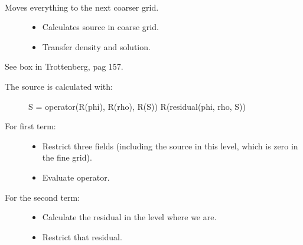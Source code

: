 \documentclass[letterpaper,10pt,english]{sphinxmanual}
\begin{document}
\begin{fulllineitems}
\label{\detokenize{sphinx-c-apidoc/output/gravity/mond_mass/go_up_and_down_mm_c:c.go_up_mm}}%
\pysigstartmultiline
{}%
\pysigstopmultiline~\begin{description}
\item[{Moves everything to the next coarser grid.}] \leavevmode\begin{itemize}
\item {} 
Calculates source in coarse grid.

\item {} 
Transfer density and solution.

\end{itemize}

\end{description}

See box in Trottenberg, pag 157.
\begin{description}
\item[{The source is calculated with:}] \leavevmode
S = operator(R(phi), R(rho), R(S)) \sphinxhyphen{} R(residual(phi, rho, S))

\item[{For first term:}] \leavevmode\begin{itemize}
\item {} 
Restrict three fields (including the source in this level, which is zero in the fine grid).

\item {} 
Evaluate operator.

\end{itemize}

\item[{For the second term:}] \leavevmode\begin{itemize}
\item {} 
Calculate the residual in the level where we are.

\item {} 
Restrict that residual.

\end{itemize}

\end{description}

\end{fulllineitems}
\end{document}

